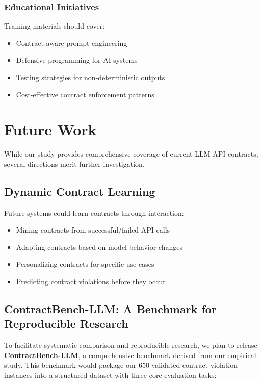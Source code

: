 \documentclass[11pt]{article}
\begin{document}
\subsubsection{Educational Initiatives}
Training materials should cover:
\begin{itemize}
    \item Contract-aware prompt engineering
    \item Defensive programming for AI systems
    \item Testing strategies for non-deterministic outputs
    \item Cost-effective contract enforcement patterns
\end{itemize}

\section{Future Work}
\label{sec:future}

While our study provides comprehensive coverage of current LLM API contracts, several directions merit further investigation.

\subsection{Dynamic Contract Learning}

Future systems could learn contracts through interaction:
\begin{itemize}
    \item Mining contracts from successful/failed API calls
    \item Adapting contracts based on model behavior changes
    \item Personalizing contracts for specific use cases
    \item Predicting contract violations before they occur
\end{itemize}

\subsection{ContractBench-LLM: A Benchmark for Reproducible Research}

To facilitate systematic comparison and reproducible research, we plan to release \textbf{ContractBench-LLM}, a comprehensive benchmark derived from our empirical study. This benchmark would package our 650 validated contract violation instances into a structured dataset with three core evaluation tasks:
\end{document}
